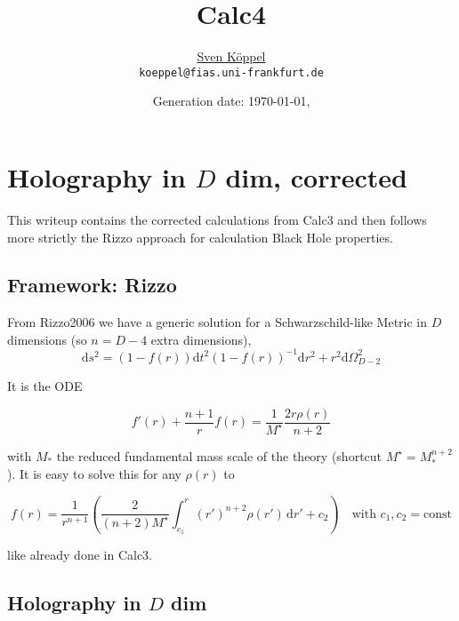 \documentclass[10pt,a4paper, fleqn]{article}
\title{\vspace{-9ex} Calc4 \vspace{-1ex}} %
\author{\small %
\href{https://itp.uni-frankfurt.de/~koeppel}{Sven Köppel} \\
\small \texttt{koeppel@fias.uni-frankfurt.de}}
\date{\small Generation date: \today, \currenttime}
\begin{document}
\maketitle

\renewcommand{\d}{\mathrm{d}}
\newcommand{\dd}[2]{\frac{\mathrm{d} #1}{\mathrm{d} #2}}
\renewcommand{\L}{L_P}
\newcommand{\pr}{p_r}
\newcommand{\psenk}{p_\perp}
\newcommand{\ebenso}{\biggl( ~ \therefore ~ \biggr) }
\newcommand{\metrik}[1]{\d s^2 = \left( #1 \right) \d t^2 \left( #1 \right)^{-1} \d r^2 + r^2 \d \Omega_{D-2}^2 }
\newcommand{\winkel}{r^2 \d \Omega^2}
\newcommand{\dann}{$\rightarrow~$}

\section{Holography in $D$ dim, corrected}
This writeup contains the corrected calculations from Calc3 and then follows more strictly the Rizzo approach for calculation Black Hole properties. 

\subsection{Framework: Rizzo}
From Rizzo2006 we have a generic solution for a Schwarzschild-like Metric in $D$ dimensions (so $n=D-4$ extra dimensions),
\begin{equation}
\metrik{1 - f(r)}
\end{equation}

It is the ODE

\begin{equation}
f'(r) + \frac{n+1}{r} f(r) = \frac{1}{M^\star} \frac{2r\rho(r)}{n+2}
\end{equation}

with $M_*$ the reduced fundamental mass scale of the theory (shortcut $M^\star = M_*^{n+2}$). It is easy to solve this for any $\rho(r)$ to

\begin{equation}
f(r) = \frac{1}{r^{n+1}} \left(\frac{2}{(n+2)M^\star}\int_{c_1}^r (r')^{n+2} \rho (r') \, \d r' + c_2 \right) \quad\text{with } c_1, c_2 =\text{const}  \label{general-sol}
\end{equation}

like already done in Calc3.

\subsection{Holography in $D$ dim}
\end{document}
